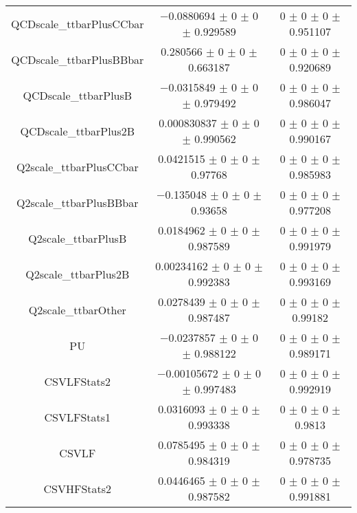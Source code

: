 \begin{table}
\begin{tabular}{ccc}
QCDscale\_ttbarPlusCCbar 	& \num{-0.0880694} $\pm$ \num{0} $\pm$ \num{0} $\pm$ \num{0.929589} 	& \num{0} $\pm$ \num{0} $\pm$ \num{0} $\pm$ \num{0.951107}\\
QCDscale\_ttbarPlusBBbar 	& \num{0.280566} $\pm$ \num{0} $\pm$ \num{0} $\pm$ \num{0.663187} 	& \num{0} $\pm$ \num{0} $\pm$ \num{0} $\pm$ \num{0.920689}\\
QCDscale\_ttbarPlusB 	& \num{-0.0315849} $\pm$ \num{0} $\pm$ \num{0} $\pm$ \num{0.979492} 	& \num{0} $\pm$ \num{0} $\pm$ \num{0} $\pm$ \num{0.986047}\\
QCDscale\_ttbarPlus2B 	& \num{0.000830837} $\pm$ \num{0} $\pm$ \num{0} $\pm$ \num{0.990562} 	& \num{0} $\pm$ \num{0} $\pm$ \num{0} $\pm$ \num{0.990167}\\
Q2scale\_ttbarPlusCCbar 	& \num{0.0421515} $\pm$ \num{0} $\pm$ \num{0} $\pm$ \num{0.97768} 	& \num{0} $\pm$ \num{0} $\pm$ \num{0} $\pm$ \num{0.985983}\\
Q2scale\_ttbarPlusBBbar 	& \num{-0.135048} $\pm$ \num{0} $\pm$ \num{0} $\pm$ \num{0.93658} 	& \num{0} $\pm$ \num{0} $\pm$ \num{0} $\pm$ \num{0.977208}\\
Q2scale\_ttbarPlusB 	& \num{0.0184962} $\pm$ \num{0} $\pm$ \num{0} $\pm$ \num{0.987589} 	& \num{0} $\pm$ \num{0} $\pm$ \num{0} $\pm$ \num{0.991979}\\
Q2scale\_ttbarPlus2B 	& \num{0.00234162} $\pm$ \num{0} $\pm$ \num{0} $\pm$ \num{0.992383} 	& \num{0} $\pm$ \num{0} $\pm$ \num{0} $\pm$ \num{0.993169}\\
Q2scale\_ttbarOther 	& \num{0.0278439} $\pm$ \num{0} $\pm$ \num{0} $\pm$ \num{0.987487} 	& \num{0} $\pm$ \num{0} $\pm$ \num{0} $\pm$ \num{0.99182}\\
PU 	& \num{-0.0237857} $\pm$ \num{0} $\pm$ \num{0} $\pm$ \num{0.988122} 	& \num{0} $\pm$ \num{0} $\pm$ \num{0} $\pm$ \num{0.989171}\\
CSVLFStats2 	& \num{-0.00105672} $\pm$ \num{0} $\pm$ \num{0} $\pm$ \num{0.997483} 	& \num{0} $\pm$ \num{0} $\pm$ \num{0} $\pm$ \num{0.992919}\\
CSVLFStats1 	& \num{0.0316093} $\pm$ \num{0} $\pm$ \num{0} $\pm$ \num{0.993338} 	& \num{0} $\pm$ \num{0} $\pm$ \num{0} $\pm$ \num{0.9813}\\
CSVLF 	& \num{0.0785495} $\pm$ \num{0} $\pm$ \num{0} $\pm$ \num{0.984319} 	& \num{0} $\pm$ \num{0} $\pm$ \num{0} $\pm$ \num{0.978735}\\
CSVHFStats2 	& \num{0.0446465} $\pm$ \num{0} $\pm$ \num{0} $\pm$ \num{0.987582} 	& \num{0} $\pm$ \num{0} $\pm$ \num{0} $\pm$ \num{0.991881}\\

\end{tabular}
\end{table}
